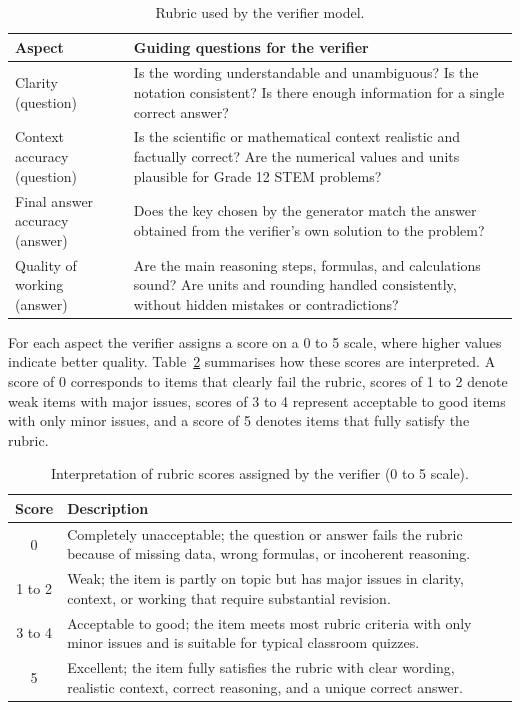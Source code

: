 \documentclass[a4paper,conference]{IEEEtran}
\begin{document}
\begin{table}[t]
\centering
\small
\caption{Rubric used by the verifier model.}
\label{tab:rubric}
\begin{tabular}{|p{3.0cm}|p{5.0cm}|}
\hline
\textbf{Aspect} & \textbf{Guiding questions for the verifier} \\ \hline
Clarity (question) &
Is the wording understandable and unambiguous? Is the notation consistent? Is there enough information for a single correct answer? \\ \hline
Context accuracy (question) &
Is the scientific or mathematical context realistic and factually correct? Are the numerical values and units plausible for Grade 12 STEM problems? \\ \hline
Final answer accuracy (answer) &
Does the key chosen by the generator match the answer obtained from the verifier's own solution to the problem? \\ \hline
Quality of working (answer) &
Are the main reasoning steps, formulas, and calculations sound? Are units and rounding handled consistently, without hidden mistakes or contradictions? \\ \hline
\end{tabular}
\normalsize
\end{table}

For each aspect the verifier assigns a score on a 0 to 5 scale, where higher values indicate better quality. Table~\ref{tab:scores} summarises how these scores are interpreted. A score of 0 corresponds to items that clearly fail the rubric, scores of 1 to 2 denote weak items with major issues, scores of 3 to 4 represent acceptable to good items with only minor issues, and a score of 5 denotes items that fully satisfy the rubric.

\begin{table}[t]
\centering
\small
\caption{Interpretation of rubric scores assigned by the verifier (0 to 5 scale).}
\label{tab:scores}
\begin{tabular}{|c|p{5.5cm}|}
\hline
\textbf{Score} & \textbf{Description} \\ \hline
0 &
Completely unacceptable; the question or answer fails the rubric because of missing data, wrong formulas, or incoherent reasoning. \\ \hline
1 to 2 &
Weak; the item is partly on topic but has major issues in clarity, context, or working that require substantial revision. \\ \hline
3 to 4 &
Acceptable to good; the item meets most rubric criteria with only minor issues and is suitable for typical classroom quizzes. \\ \hline
5 &
Excellent; the item fully satisfies the rubric with clear wording, realistic context, correct reasoning, and a unique correct answer. \\ \hline
\end{tabular}
\normalsize
\end{table}
\end{document}
